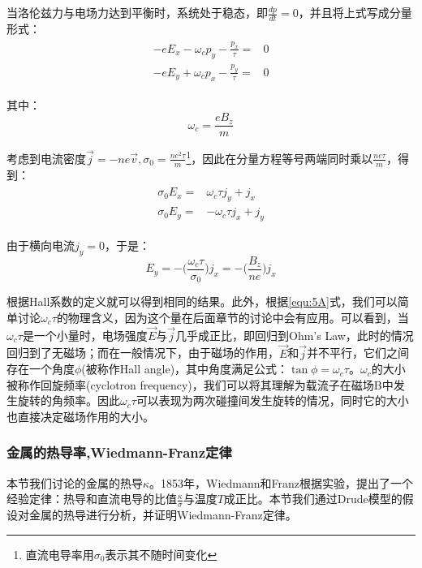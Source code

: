 \documentclass{ctexart}
\begin{document}
                当洛伦兹力与电场力达到平衡时，系统处于稳态，即$\frac{dp}{dt}=0$，并且将上式写成分量形式：
                \begin{align}
                    \begin{split}
                        -eE_x-\omega_cp_y-\frac{p_x}{\tau}=&0\\
                        -eE_y+\omega_cp_x-\frac{p_y}{\tau}=&0
                    \end{split}
                \end{align}
                
                其中：
                \begin{equation}
                    \omega_c=\frac{eB_z}{m}
                \end{equation}
                
                考虑到电流密度$\vec{j}=-ne\vec{v},\sigma_0=\frac{ne^2\tau}{m}$\footnote{直流电导率用$\sigma_0$表示其不随时间变化}，因此在分量方程等号两端同时乘以$\frac{ne\tau}{m}$，得到：
                \begin{align}\label{equ:5A}
                    \begin{split}
                        \sigma_0E_x=&\omega_c\tau j_y+j_x\\
                        \sigma_0E_y=&-\omega_c\tau j_x +j_y
                    \end{split}
                \end{align}
                
                由于横向电流$j_y=0$，于是：
                \begin{equation}
                    E_y=-\Big(\frac{\omega_c\tau}{\sigma_0}\Big)j_x=-\Big(\frac{B_z}{ne}\Big)j_x
                \end{equation}
                
                根据Hall系数的定义就可以得到相同的结果。此外，根据\eqref{equ:5A}式，我们可以简单讨论$\omega_c\tau$的物理含义，因为这个量在后面章节的讨论中会有应用。可以看到，当$\omega_c\tau$是一个小量时，电场强度$\vec{E}$与$\vec{j}$几乎成正比，即回归到Ohm's Law，此时的情况回归到了无磁场；而在一般情况下，由于磁场的作用，$\vec{E}$和$\vec{j}$并不平行，它们之间存在一个角度$\phi$(被称作Hall angle)，其中角度满足公式：$\tan{\phi}=\omega_c\tau$。$\omega_c$的大小被称作回旋频率(cyclotron frequency)，我们可以将其理解为载流子在磁场B中发生旋转的角频率。因此$\omega_c\tau$可以表现为两次碰撞间发生旋转的情况，同时它的大小也直接决定磁场作用的大小。
             \subsubsection{金属的热导率,Wiedmann-Franz定律}
                本节我们讨论的金属的热导$\kappa$。1853年，Wiedmann和Franz根据实验，提出了一个经验定律：热导和直流电导的比值$\frac{\kappa}{\sigma}$与温度$T$成正比。本节我们通过Drude模型的假设对金属的热导进行分析，并证明Wiedmann-Franz定律。
                
\end{document}
